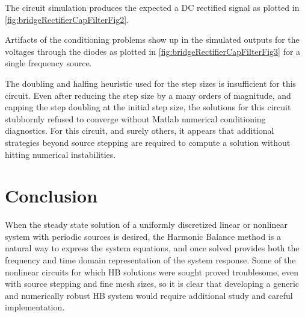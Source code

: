 
The circuit simulation produces the expected a DC rectified signal as plotted in \cref{fig:bridgeRectifierCapFilterFig2}.


Artifacts of the conditioning problems show up in the simulated outputs for the voltages through the diodes as plotted in \cref{fig:bridgeRectifierCapFilterFig3} for a single frequency source.


The doubling and halfing heuristic used for the step sizes is insufficient for this circuit.
Even after
reducing the step size by a many orders of magnitude, and capping the step doubling at the initial step size, the solutions for this circuit stubbornly refused to converge without Matlab numerical conditioning diagnostics.
For this circuit, and surely others, it appears that additional strategies beyond source stepping are required to compute a solution without hitting numerical instabilities.

\section{Conclusion}

When the steady state solution of a uniformly discretized linear or nonlinear system with periodic sources is desired, the Harmonic Balance method is a natural way to express the system equations, and once solved provides both the frequency and time domain representation of the system response.  Some of the nonlinear circuits for which HB solutions were sought proved troublesome, even with source stepping and fine mesh sizes, so it is clear that developing a generic and numerically robust HB system would require additional study and careful implementation.

